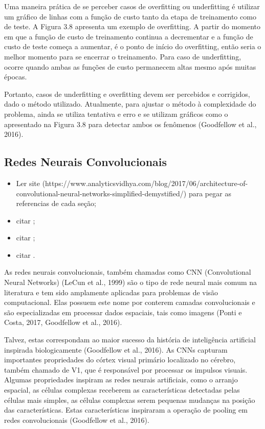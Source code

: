 Uma maneira prática de se perceber casos de overfitting ou underfitting é utilizar um gráfico de linhas com a função de custo tanto da etapa de treinamento como de teste. A Figura 3.8 apresenta um exemplo de overfitting. A partir do momento em que a função de custo de treinamento continua a decrementar e a função de custo de teste começa a aumentar, é o ponto de início do overfitting, então seria o melhor momento para se encerrar o treinamento. Para caso de underfitting, ocorre quando ambas as funções de custo permanecem altas mesmo após muitas épocas.

Portanto, casos de underfitting e overfitting devem ser percebidos e corrigidos, dado o método utilizado. Atualmente, para ajustar o método à complexidade do problema, ainda se utiliza tentativa e erro e se utilizam gráficos como o apresentado na Figura 3.8 para detectar ambos os fenômenos (Goodfellow et al., 2016).


\subsection{Redes Neurais Convolucionais}
\label{deep:CNN}
\begin{itemize}
    \item Ler site (https://www.analyticsvidhya.com/blog/2017/06/architecture-of-convolutional-neural-networks-simplified-demystified/) para pegar as referencias de cada seção;
    \item citar \cite{Minaee2021};
    \item citar \cite{Parkhi2015};
    \item citar \cite{Ghosh2019}.
\end{itemize}

As redes neurais convolucionais, também chamadas como CNN (Convolutional Neural Networks) (LeCun et al., 1999) são o tipo de rede neural mais comum na literatura e tem sido amplamente aplicadas para problemas de visão computacional. Elas possuem este nome por conterem camadas convolucionais e são especializadas em processar dados espaciais, tais como imagens (Ponti e Costa, 2017, Goodfellow et al., 2016).

Talvez, estas correspondam ao maior sucesso da história de inteligência artificial inspirada biologicamente (Goodfellow et al., 2016). As CNNs capturam importantes propriedades do córtex visual primário localizado no cérebro, também chamado de V1, que é responsável por processar os impulsos visuais. Algumas propriedades inspiram as redes neurais artificiais, como o arranjo espacial, as células complexas receberem as características detectadas pelas células mais simples, as células complexas serem pequenas mudanças na posição das características. Estas características inspiraram a operação de pooling em redes convolucionais (Goodfellow et al., 2016).

